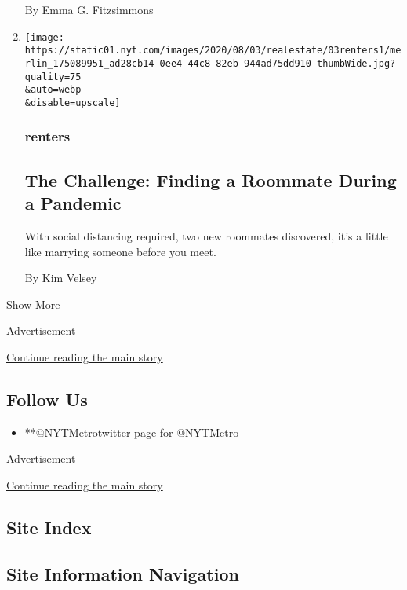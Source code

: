 \begin{enumerate}
  By Emma G. Fitzsimmons
\item
  \href{/2020/08/03/realestate/coronavirus-roommate-renters.html}{}

  \texttt{[image: https://static01.nyt.com/images/2020/08/03/realestate/03renters1/merlin\_175089951\_ad28cb14-0ee4-44c8-82eb-944ad75dd910-thumbWide.jpg?quality=75\\\&auto=webp\\\&disable=upscale]}

  \hypertarget{renters}{%
  \subsubsection{renters}\label{renters}}

  \hypertarget{the-challenge-finding-a-roommate-during-a-pandemic}{%
  \subsection{The Challenge: Finding a Roommate During a
  Pandemic}\label{the-challenge-finding-a-roommate-during-a-pandemic}}

  With social distancing required, two new roommates discovered, it's a
  little like marrying someone before you meet.

  By Kim Velsey
\end{enumerate}

Show More

Advertisement

\protect\hyperlink{after-mid2}{Continue reading the main story}

\hypertarget{follow-us}{%
\subsection{Follow Us}\label{follow-us}}

\begin{itemize}
\tightlist
\item
  \href{https://twitter.com/NYTMetro}{**@NYTMetrotwitter page for
  @NYTMetro}
\end{itemize}

Advertisement

\protect\hyperlink{after-mktg}{Continue reading the main story}

\hypertarget{site-index}{%
\subsection{Site Index}\label{site-index}}

\hypertarget{site-information-navigation}{%
\subsection{Site Information
Navigation}\label{site-information-navigation}}

